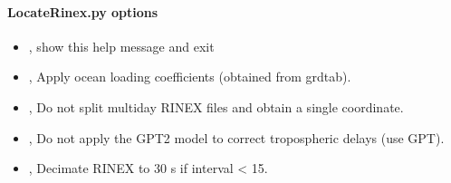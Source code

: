 \documentclass[letterpaper,10pt,english]{sphinxmanual}
\begin{document}
\paragraph{LocateRinex.py options}
\label{\detokenize{com:LocateRinex.py-options}}\begin{itemize}
\item {} 
\sphinxAtStartPar
{\hyperref[\detokenize{com:LocateRinex.py--h}]{}}, {\hyperref[\detokenize{com:LocateRinex.py---help}]{}} \sphinxhyphen{} show this help message and exit

\item {} 
\sphinxAtStartPar
{\hyperref[\detokenize{com:LocateRinex.py--otl}]{}}, {\hyperref[\detokenize{com:LocateRinex.py---ocean_loading}]{}} \sphinxhyphen{} Apply ocean loading coefficients (obtained from grdtab).

\item {} 
\sphinxAtStartPar
{\hyperref[\detokenize{com:LocateRinex.py--ns}]{}}, {\hyperref[\detokenize{com:LocateRinex.py---no_split}]{}} \sphinxhyphen{} Do not split multiday RINEX files and obtain a single coordinate.

\item {} 
\sphinxAtStartPar
{\hyperref[\detokenize{com:LocateRinex.py--no_met}]{}}, {\hyperref[\detokenize{com:LocateRinex.py---no_met}]{}} \sphinxhyphen{} Do not apply the GPT2 model to correct tropospheric delays (use GPT).

\item {} 
\sphinxAtStartPar
{\hyperref[\detokenize{com:LocateRinex.py--dec}]{}}, {\hyperref[\detokenize{com:LocateRinex.py---decimate}]{}} \sphinxhyphen{} Decimate RINEX to 30 s if interval \textless{} 15.


\end{itemize}
\end{document}
